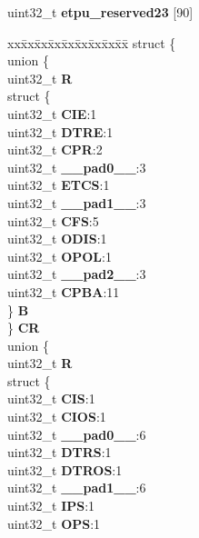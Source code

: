 \begin{DoxyCompactItemize}
\begin{tabbing}
\end{tabbing}\item 
\mbox{\label{structETPU__tag_a269438d19b3f27d1fb412e7d349f006c}} 
uint32\+\_\+t {\bfseries etpu\+\_\+reserved23} \mbox{[}90\mbox{]}
\item 
\mbox{\label{structETPU__tag_a3d148e90530d70f909562fe9cd93eb24}} 
\begin{tabbing}
xx\=xx\=xx\=xx\=xx\=xx\=xx\=xx\=xx\=\kill
struct \{\\
\>union \{\\
\>\>uint32\_t {\bfseries R}\\
\>\>struct \{\\
\>\>\>uint32\_t {\bfseries CIE}:1\\
\>\>\>uint32\_t {\bfseries DTRE}:1\\
\>\>\>uint32\_t {\bfseries CPR}:2\\
\>\>\>uint32\_t {\bfseries \_\_pad0\_\_}:3\\
\>\>\>uint32\_t {\bfseries ETCS}:1\\
\>\>\>uint32\_t {\bfseries \_\_pad1\_\_}:3\\
\>\>\>uint32\_t {\bfseries CFS}:5\\
\>\>\>uint32\_t {\bfseries ODIS}:1\\
\>\>\>uint32\_t {\bfseries OPOL}:1\\
\>\>\>uint32\_t {\bfseries \_\_pad2\_\_}:3\\
\>\>\>uint32\_t {\bfseries CPBA}:11\\
\>\>\} {\bfseries B}\\
\>\} {\bfseries CR}\\
\>union \{\\
\>\>uint32\_t {\bfseries R}\\
\>\>struct \{\\
\>\>\>uint32\_t {\bfseries CIS}:1\\
\>\>\>uint32\_t {\bfseries CIOS}:1\\
\>\>\>uint32\_t {\bfseries \_\_pad0\_\_}:6\\
\>\>\>uint32\_t {\bfseries DTRS}:1\\
\>\>\>uint32\_t {\bfseries DTROS}:1\\
\>\>\>uint32\_t {\bfseries \_\_pad1\_\_}:6\\
\>\>\>uint32\_t {\bfseries IPS}:1\\
\>\>\>uint32\_t {\bfseries OPS}:1\\

\end{tabbing}
\end{DoxyCompactItemize}
